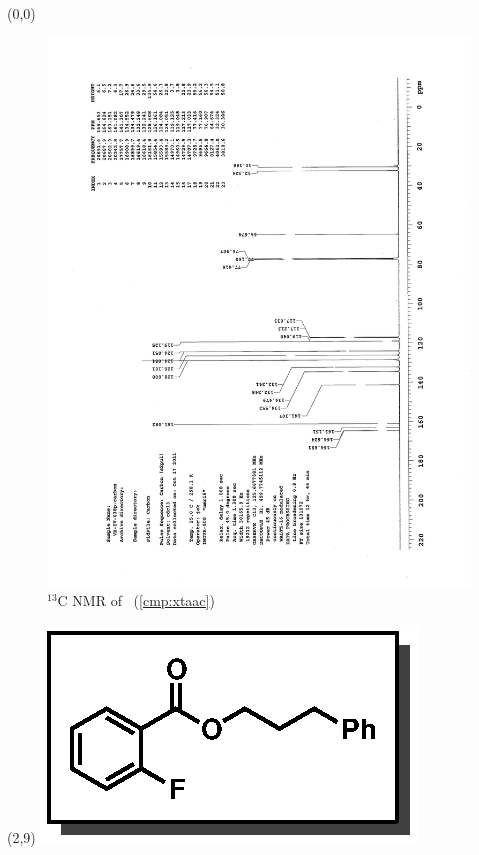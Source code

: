 \clearpage
\begin{textblock}{20}(0,0)
\begin{figure}[htb]
\caption{$^{13}$C NMR of  \CMPxtaac\ (\ref{cmp:xtaac})}
\includegraphics[scale=0.75, trim = 0mm 0mm 0mm 5mm,
clip]{chp_asymmetric/images/nmr/xtaacC}
\vspace{-100pt}
\end{figure}
\end{textblock}
\begin{textblock}{1}(2,9)
\includegraphics[scale=0.8, angle=90]{chp_asymmetric/images/xtaac}
\end{textblock}
